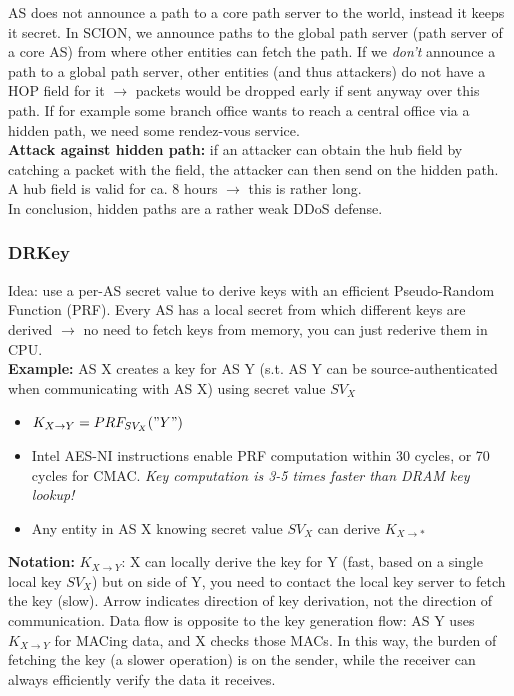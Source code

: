 \documentclass[11pt,oneside,a4paper]{article}
\begin{document}
AS does not announce a path to a core path server to the world, instead it keeps it secret. In SCION, we announce paths to the global path server (path server of a core AS) from where other entities can fetch the path. If we \textit{don't} announce a path to a global path server, other entities (and thus attackers) do not have a HOP field for it $\rightarrow$ packets would be dropped early if sent anyway over this path.
If for example some branch office wants to reach a central office via a hidden path, we need some rendez-vous service.\\

\textbf{Attack against hidden path:} if an attacker can obtain the hub field by catching a packet with the field, the attacker can then send on the hidden path. A hub field is valid for ca. 8 hours $\rightarrow$ this is rather long.\\

In conclusion, hidden paths are a rather weak DDoS defense.

\subsubsection{DRKey}

Idea: use a per-AS secret value to derive keys with an efficient Pseudo-Random Function (PRF). Every AS has a local secret from which different keys are derived $\rightarrow$ no need to fetch keys from memory, you can just rederive them in CPU.\\

\textbf{Example:} AS X creates a key for AS Y (s.t. AS Y can be source-authenticated when communicating with AS X) using secret value $SV_X$

\vspace{-\topsep}
\begin{itemize}
	\setlength{\itemsep}{0pt}
	\setlength{\parskip}{0pt}
	\item $K_{X\rightarrow Y} = PRF_{SV_X}("Y")$
	\item Intel AES-NI instructions enable PRF computation within 30 cycles, or 70 cycles for CMAC. \textit{Key computation is 3-5 times faster than DRAM key lookup!}
	\item Any entity in AS X knowing secret value $SV_X$ can derive $K_{X\rightarrow *}$
\end{itemize}
\vspace{-\topsep}

\textbf{Notation:} $K_{X\rightarrow Y}$: X can locally derive the key for Y (fast, based on a single local key $SV_X$) but on side of Y, you need to contact the local key server to fetch the key (slow). Arrow indicates direction of key derivation, not the direction of communication. Data flow is opposite to the key generation flow: AS Y uses $K_{X\rightarrow Y}$ for MACing data, and X checks those MACs. In this way, the burden of fetching the key (a slower operation) is on the
sender, while the receiver can always efficiently verify the data it receives.\\
\end{document}

